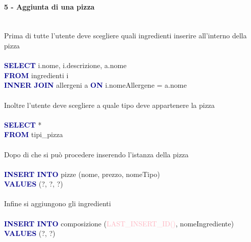 \documentclass[a4paper,12pt, oneside]{article}
\begin{document}
\paragraph{5 - Aggiunta di una pizza}
\hphantom{A}\\    %
Prima di tutte l'utente deve scegliere quali ingredienti inserire all'interno della pizza
\\\\
\textcolor{darkBlue}{\textbf{SELECT}} i.nome, i.descrizione, a.nome
\\\textcolor{darkBlue}{\textbf{FROM}} ingredienti i
\\\textcolor{darkBlue}{\textbf{INNER JOIN}} allergeni a \textcolor{darkBlue}{\textbf{ON}} i.nomeAllergene = a.nome
\\\\
Inoltre l'utente deve scegliere a quale tipo deve appartenere la pizza
\\\\
\textcolor{darkBlue}{\textbf{SELECT}} *
\\\textcolor{darkBlue}{\textbf{FROM}} tipi\_pizza
\\\\
Dopo di che si può procedere inserendo l'istanza della pizza
\\\\
\textcolor{darkBlue}{\textbf{INSERT INTO}} pizze (nome, prezzo, nomeTipo)
\\\textcolor{darkBlue}{\textbf{VALUES}} (?, ?, ?)
\\\\
Infine si aggiungono gli ingredienti
\\\\
\textcolor{darkBlue}{\textbf{INSERT INTO}} composizione (\textcolor{lightPink}{LAST\_INSERT\_ID()}, nomeIngrediente)
\\\textcolor{darkBlue}{\textbf{VALUES}} (?, ?)
\end{document}
